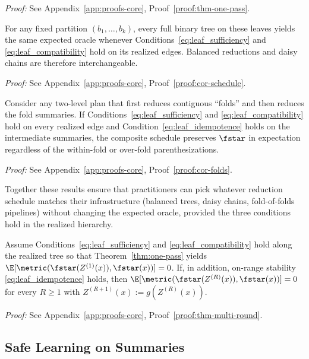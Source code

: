 \noindent\textit{Proof:} See Appendix~\ref{app:proofs-core}, Proof~\ref{proof:thm-one-pass}.

\begin{corollary}\label{cor:schedule}
For any fixed partition $(b_1, \ldots, b_k)$, every full binary tree on these leaves yields the same expected oracle whenever Conditions~\eqref{eq:leaf_sufficiency} and \eqref{eq:leaf_compatibility} hold on its realized edges. Balanced reductions and daisy chains are therefore interchangeable.
\end{corollary}

\noindent\textit{Proof:} See Appendix~\ref{app:proofs-core}, Proof~\ref{proof:cor-schedule}.

\begin{corollary}\label{cor:folds}
Consider any two-level plan that first reduces contiguous ``folds'' and then reduces the fold summaries. If Conditions~\eqref{eq:leaf_sufficiency} and \eqref{eq:leaf_compatibility} hold on every realized edge and Condition~\eqref{eq:leaf_idempotence} holds on the intermediate summaries, the composite schedule preserves $\fstar$ in expectation regardless of the within-fold or over-fold parenthesizations.
\end{corollary}

\noindent\textit{Proof:} See Appendix~\ref{app:proofs-core}, Proof~\ref{proof:cor-folds}.

Together these results ensure that practitioners can pick whatever reduction schedule matches their infrastructure (balanced trees, daisy chains, fold-of-folds pipelines) without changing the expected oracle, provided the three conditions hold in the realized hierarchy.

\begin{theorem}\label{thm:multi-round}
Assume Conditions~\eqref{eq:leaf_sufficiency} and \eqref{eq:leaf_compatibility} hold along the realized tree so that Theorem~\ref{thm:one-pass} yields $\E[\metric(\fstar(Z^{(1)}(x)), \fstar(x))] = 0$. If, in addition, on-range stability \eqref{eq:leaf_idempotence} holds, then $\E[\metric(\fstar(Z^{(R)}(x)), \fstar(x))] = 0$ for every $R \geq 1$ with $Z^{(R+1)}(x) := g(Z^{(R)}(x))$.
\end{theorem}

\noindent\textit{Proof:} See Appendix~\ref{app:proofs-core}, Proof~\ref{proof:thm-multi-round}.

\subsection{Safe Learning on Summaries}\label{sec:exist-learn-transport}

